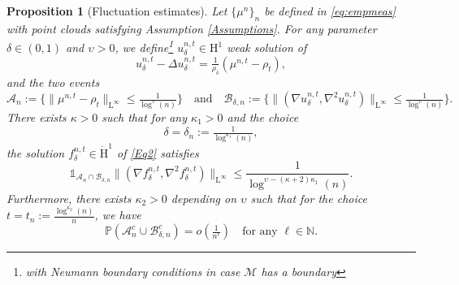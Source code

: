 \documentclass[11pt,a4paper,oneside]{amsart}
\numberwithin{equation}{section}
\newtheorem{proposition}[theorem]{Proposition}
\newcommand{\LL}{\mathrm{L}}
\begin{document}
%
\begin{proposition}[Fluctuation estimates]\label{Fluctuation}
%
Let $\{\mu^n\}_n$ be defined in \eqref{eq:empmeas} with point clouds satisfying Assumption \ref{Assumptions}. For any parameter $\delta\in (0,1)$ and $\upsilon>0$, we define\footnote{with Neumann boundary conditions in case $\mathcal{M}$ has a boundary} $u^{n,t}_{\delta}\in \mathrm{H}^1$ weak solution of
%
\begin{equation}\label{Eq3Bis}
%
u^{n,t}_{\delta} -\Delta u^{n,t}_{\delta}=\tfrac{1}{\rho_\delta}(\mu^{n,t}-\rho_t),
\end{equation}
%
and the two events
%
\begin{equation}\label{Events}
%
\mathcal{A}_n:=\Big\{\|\mu^{n,t}-\rho_t\|_{\LL^{\infty}}\leq \tfrac{1}{\log^{\upsilon}(n)}\Big\}\quad \text{and}\quad\mathcal{B}_{\delta,n}:=\Big\{\big\|(\nabla u^{n,t}_\delta,\nabla^2 u^{n,t}_{\delta})\big\|_{\LL^{\infty}}\leq \tfrac{1}{\log^{\upsilon}(n)}\Big\}.
%
\end{equation}
%
There exists $\kappa>0$ such that for any $\kappa_1>0$ and the choice 
%
\begin{equation}\label{Eq:ChoicesPara}
\delta=\delta_n:=\tfrac{1}{\log^{\kappa_1}(n)},
\end{equation}
%
the solution $f^{n,t}_\delta\in \dot{\mathrm{H}}^1$ of \eqref{Eq2} satisfies
%
\begin{equation}\label{Eq6}
\mathds{1}_{\mathcal{A}_n\cap\mathcal{B}_{\delta,n}}\big\|(\nabla f^{n,t}_\delta,\nabla^2 f^{n,t}_{\delta})\big\|_{\LL^{\infty}}\leq \frac{1}{\log^{\upsilon-(\kappa+2)\kappa_1}(n)}.
\end{equation}
%
Furthermore, there exists $\kappa_2>0$ depending on $\upsilon$ such that for the choice $t=t_n:=\frac{\log^{\kappa_2}(n)}{n}$, we have
%
\begin{equation}\label{Eq13}
\mathbb{P}(\mathcal{A}^{c}_n\cup\mathcal{B}^c_{\delta,n})=o(\tfrac{1}{n^\ell})\quad\text{for any $\ell\in\mathbb{N}$}.
\end{equation}
%



\end{proposition}
\end{document}
